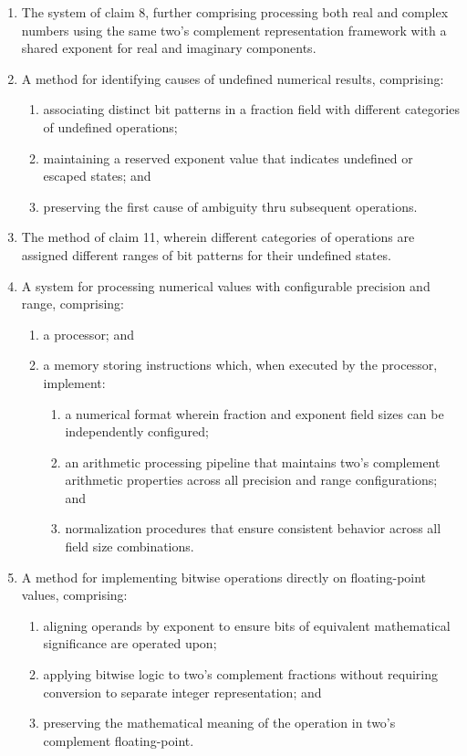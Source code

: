 \documentclass[12pt,letter]{article}
\begin{document}
\begin{enumerate}
    \item The system of claim 8, further comprising processing both real and complex numbers using the same two's complement representation framework with a shared exponent for real and imaginary components.
    
    \item A method for identifying causes of undefined numerical results, comprising:
        \begin{enumerate}
            \item associating distinct bit patterns in a fraction field with different categories of undefined operations;
            \item maintaining a reserved exponent value that indicates undefined or escaped states; and
            \item preserving the first cause of ambiguity thru subsequent operations.
        \end{enumerate}
    
    \item The method of claim 11, wherein different categories of operations are assigned different ranges of bit patterns for their undefined states.
    
    \item A system for processing numerical values with configurable precision and range, comprising:
        \begin{enumerate}
            \item a processor; and
            \item a memory storing instructions which, when executed by the processor, implement:
                \begin{enumerate}
                    \item a numerical format wherein fraction and exponent field sizes can be independently configured;
                    \item an arithmetic processing pipeline that maintains two's complement arithmetic properties across all precision and range configurations; and
                    \item normalization procedures that ensure consistent behavior across all field size combinations.
                \end{enumerate}
        \end{enumerate}
    
    \item A method for implementing bitwise operations directly on floating-point values, comprising:
        \begin{enumerate}
            \item aligning operands by exponent to ensure bits of equivalent mathematical significance are operated upon;
            \item applying bitwise logic to two's complement fractions without requiring conversion to separate integer representation; and
            \item preserving the mathematical meaning of the operation in two's complement floating-point.
        \end{enumerate}
    

\end{enumerate}
\end{document}
